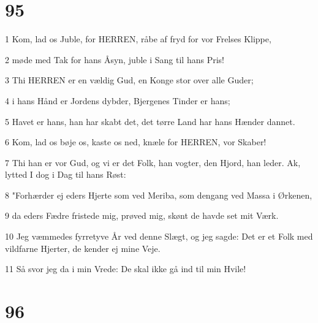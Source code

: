 \chapter{95}

\par 1 Kom, lad os Juble, for HERREN, råbe af fryd for vor Frelses Klippe,
\par 2 møde med Tak for hans Åsyn, juble i Sang til hans Pris!
\par 3 Thi HERREN er en vældig Gud, en Konge stor over alle Guder;
\par 4 i hans Hånd er Jordens dybder, Bjergenes Tinder er hans;
\par 5 Havet er hans, han har skabt det, det tørre Land har hans Hænder dannet.
\par 6 Kom, lad os bøje os, kaste os ned, knæle for HERREN, vor Skaber!
\par 7 Thi han er vor Gud, og vi er det Folk, han vogter, den Hjord, han leder. Ak, lytted I dog i Dag til hans Røst:
\par 8 "Forhærder ej eders Hjerte som ved Meriba, som dengang ved Massa i Ørkenen,
\par 9 da eders Fædre fristede mig, prøved mig, skønt de havde set mit Værk.
\par 10 Jeg væmmedes fyrretyve År ved denne Slægt, og jeg sagde: Det er et Folk med vildfarne Hjerter, de kender ej mine Veje.
\par 11 Så svor jeg da i min Vrede: De skal ikke gå ind til min Hvile!

\chapter{96}

